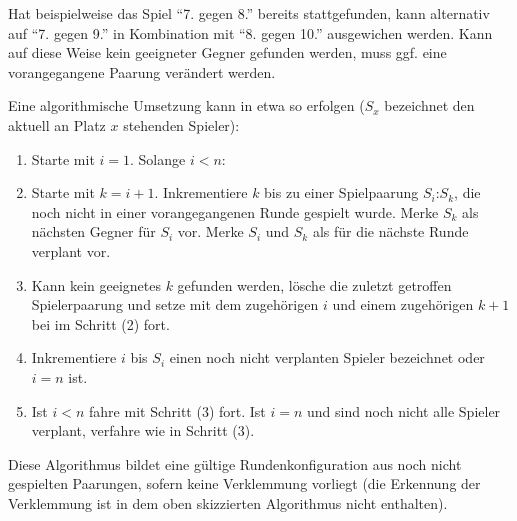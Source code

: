 \documentclass[DIV=15, 10pt]{scrartcl}
\begin{document}
Hat beispielweise das Spiel "`7. gegen 8."' bereits stattgefunden, kann alternativ auf  "`7. gegen 9."' in Kombination mit "`8. gegen 10."' ausgewichen werden. Kann auf diese Weise kein geeigneter Gegner gefunden werden, muss ggf. eine vorangegangene Paarung verändert werden.

Eine algorithmische Umsetzung kann in etwa so erfolgen ($S_x$ bezeichnet den aktuell an Platz $x$ stehenden Spieler):

\begin{enumerate}

\item Starte mit $i = 1$. Solange $i < n$:

\item Starte mit $k = i + 1$. Inkrementiere $k$ bis zu einer Spielpaarung $S_i$:$S_k$, die noch nicht in einer vorangegangenen Runde gespielt wurde. Merke $S_k$ als nächsten Gegner für $S_i$ vor. Merke $S_i$ und $S_k$ als für die nächste Runde verplant vor.

\item Kann kein geeignetes $k$ gefunden werden, lösche die zuletzt getroffen Spielerpaarung und setze mit dem zugehörigen $i$ und einem zugehörigen $k+1$ bei im Schritt (2) fort.

\item Inkrementiere $i$ bis $S_i$ einen noch nicht verplanten Spieler bezeichnet oder $i = n$ ist.

\item Ist $i < n$ fahre mit Schritt (3) fort. Ist $i = n$ und sind noch nicht alle Spieler verplant, verfahre wie in Schritt (3).

\end{enumerate}

Diese Algorithmus bildet eine gültige Rundenkonfiguration aus noch nicht gespielten Paarungen, sofern keine Verklemmung vorliegt (die Erkennung der Verklemmung ist in dem oben skizzierten Algorithmus nicht enthalten).

\end{document}
